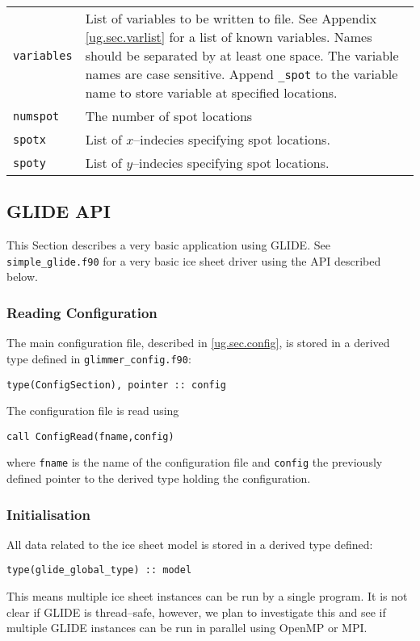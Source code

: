 \begin{center}
\begin{supertabular}{|l|p{11cm}|}
   \texttt{variables} & List of variables to be written to file. See Appendix \ref{ug.sec.varlist} for a list of known variables. Names should be separated by at least one space. The variable names are case sensitive. Append \texttt{\_spot} to the variable name to store variable at specified locations.\\
   \texttt{numspot} & The number of spot locations\\
   \texttt{spotx} & List of $x$--indecies specifying spot locations.\\
   \texttt{spoty} & List of $y$--indecies specifying spot locations.\\   
  \hline
  \end{supertabular}
\end{center}

\subsection{GLIDE API}
This Section describes a very basic application using GLIDE. See \texttt{simple\_glide.f90} for a very basic ice sheet driver using the API described below.
\subsubsection{Reading Configuration}
The main configuration file, described in \ref{ug.sec.config}, is stored in a derived type defined in \texttt{glimmer\_config.f90}:
\begin{verbatim}
type(ConfigSection), pointer :: config
\end{verbatim}
The configuration file is read using
\begin{verbatim}
call ConfigRead(fname,config)
\end{verbatim}
where \texttt{fname} is the name of the configuration file and \texttt{config} the previously defined pointer to the derived type holding the configuration.

\subsubsection{Initialisation}
All data related to the ice sheet model is stored in a derived type defined:
\begin{verbatim}
type(glide_global_type) :: model
\end{verbatim}
This means multiple ice sheet instances can be run by a single program. It is not clear if GLIDE is thread--safe, however, we plan to investigate this and see if multiple GLIDE instances can be run in parallel using OpenMP or MPI.

